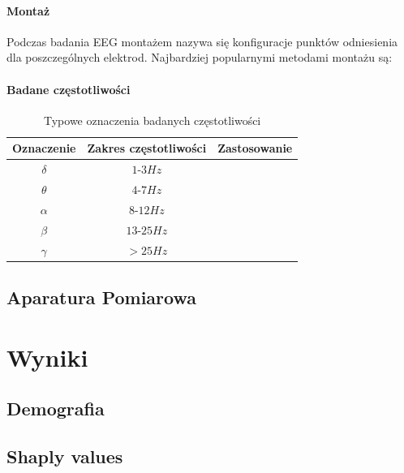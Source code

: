 \documentclass{./assets/wfis}
\begin{document}
\subsubsection{Montaż}
Podczas badania EEG montażem nazywa się konfiguracje punktów odniesienia dla poszczególnych elektrod. Najbardziej popularnymi metodami montażu są:


\subsubsection{Badane częstotliwości}

\begin{table}[h]
    \centering
    \begin{tabular}{|c|c|c|}
        \hline
        Oznaczenie & Zakres częstotliwości & Zastosowanie \\
        \hline
        $\delta$ & $1$-$3Hz$ & \\
        $\theta$ & $4$-$7Hz$ & \\
        $\alpha$ & $8$-$12Hz$ & \\
        $\beta$  & $13$-$25Hz$ & \\
        $\gamma$ & $>25Hz$ & \\
        \hline
    \end{tabular}
    \caption{Typowe oznaczenia badanych częstotliwości}
    \label{tab:freqs}
\end{table}


\section{Aparatura Pomiarowa}


\chapter{Wyniki}
\section{Demografia}
\section{Shaply values}

\printbibliography

\clearpage
\thispagestyle{empty}
\listoffigures
\listoftables
\clearpage
\end{document}
